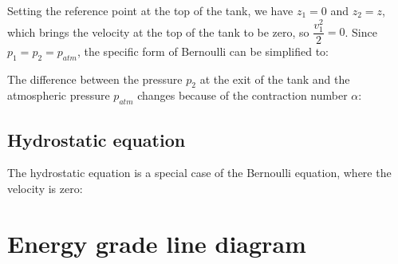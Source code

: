 \documentclass{article}
\begin{document}
Setting the reference point at the top of the tank, we have $z_1 = 0$ and $z_2 = z$,
which brings the velocity at the top of the tank to be zero, so $\dfrac{v_1^2}{2} = 0$.
Since $p_1=p_2=p_{atm}$, the specific form of Bernoulli can be simplified to:

The difference between the pressure $p_2$ at the exit of the tank and the atmospheric pressure $p_{atm}$
changes because of the contraction number $\alpha$:

\subsection{Hydrostatic equation}
The hydrostatic equation is a special case of the Bernoulli equation, where the velocity is zero:

\newpage
\section{Energy grade line diagram}
\end{document}

